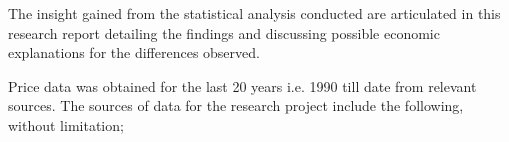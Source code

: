 \documentclass[12pt,twoside]{article}
\begin{document}
\begin{justify}
{\fontsize{11pt}{13.2pt}\selectfont The insight gained from the statistical analysis conducted are articulated in this research report detailing the findings and discussing possible economic explanations for the differences observed.\par}
\end{justify}\par

{\fontsize{11pt}{13.2pt}\selectfont \par}
\par

\begin{justify}
{\fontsize{11pt}{13.2pt}\selectfont Price data was obtained for the last 20 years i.e. 1990 till date from relevant sources. The sources of data for the research project include the following, without limitation;\par}
\end{justify}\par
\end{document}
